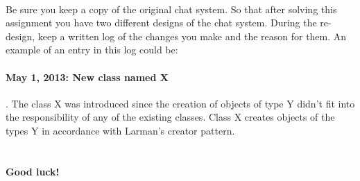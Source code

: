\documentclass{article}
\begin{document}
    \paragraph{}
    Be sure you keep a copy of the original chat system. So that after solving this assignment you have two different designs of the chat system. During the re-design, keep a written log of the changes you make and the reason for them. An example of an entry in this log could be:

    \paragraph{May 1, 2013: New class named X} . The class X was introduced since the creation of objects of type Y didn't fit into the responsibility of any of the existing classes. Class X creates objects of the types Y in accordance with Larman's creator pattern.

\section*{}
\paragraph{Good luck!}
\end{document}
